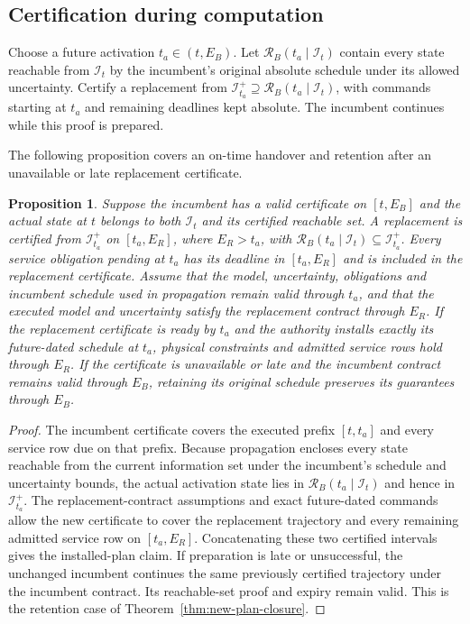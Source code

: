 \documentclass[preprint,12pt]{elsarticle}
\newtheorem{proposition}{Proposition}
\begin{document}
\subsection{Certification during computation}
\label{sec:planned-handover}

Choose a future activation $t_a\in(t,E_B)$. Let
$\mathcal R_B(t_a\mid\mathcal I_t)$ contain every state reachable from
$\mathcal I_t$ by the incumbent's original absolute schedule under its
allowed uncertainty. Certify a replacement from
$\mathcal I_{t_a}^+\supseteq\mathcal R_B(t_a\mid\mathcal I_t)$, with commands
starting at $t_a$ and remaining deadlines kept absolute. The incumbent
continues while this proof is prepared.

The following proposition covers an on-time handover and retention after
an unavailable or late replacement certificate.

\begin{proposition}
\label{prop:planned-handover}
Suppose the incumbent has a valid certificate on $[t,E_B]$ and the
actual state at $t$ belongs to both $\mathcal I_t$ and its certified
reachable set. A replacement is certified from $\mathcal I_{t_a}^+$ on
$[t_a,E_R]$, where $E_R>t_a$, with
$\mathcal R_B(t_a\mid\mathcal I_t)\subseteq\mathcal I_{t_a}^+$.
Every service obligation pending at $t_a$ has its deadline in $[t_a,E_R]$
and is included in the replacement certificate. Assume that the model,
uncertainty, obligations and incumbent schedule used in propagation
remain valid through $t_a$, and that the executed model and uncertainty
satisfy the replacement contract through $E_R$.
If the replacement certificate is ready by
$t_a$ and the authority installs exactly its future-dated schedule at $t_a$,
physical constraints and admitted service rows hold through $E_R$.
If the certificate is unavailable or late and the incumbent contract
remains valid through $E_B$, retaining its original schedule preserves
its guarantees through $E_B$.
\end{proposition}

\begin{proof}
The incumbent certificate covers the executed prefix $[t,t_a]$ and every
service row due on that prefix. Because propagation encloses every state reachable from the current
information set under the incumbent's schedule and uncertainty bounds,
the actual activation state lies in
$\mathcal R_B(t_a\mid\mathcal I_t)$ and hence in $\mathcal I_{t_a}^+$. The replacement-contract assumptions and exact
future-dated commands allow the new certificate to cover the replacement
trajectory and every remaining admitted service row on $[t_a,E_R]$.
Concatenating these two certified intervals gives the installed-plan
claim. If preparation is late or unsuccessful, the unchanged incumbent
continues the same previously certified trajectory under the incumbent
contract. Its reachable-set proof and expiry remain valid. This is the retention case of
Theorem~\ref{thm:new-plan-closure}.
\end{proof}
\end{document}
